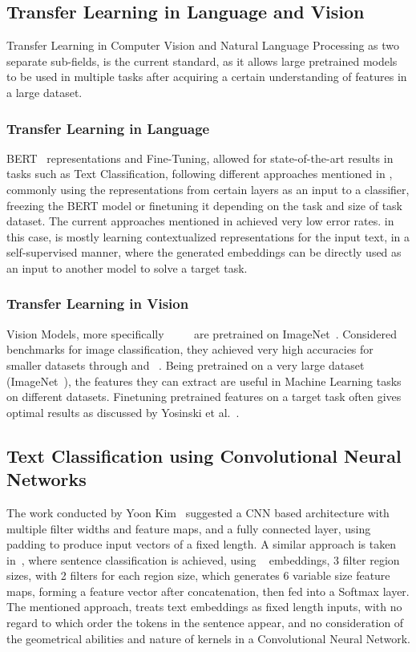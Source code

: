 \documentclass[conference]{IEEEtran}
\begin{document}
\subsection{Transfer Learning in Language and Vision}
Transfer Learning in Computer Vision and Natural Language Processing as two separate sub-fields, is the current standard, as it allows large pretrained models to be used in multiple tasks after acquiring a certain understanding of features in a large dataset.

\subsubsection{Transfer Learning in Language}

BERT~\cite{Bert} representations and Fine-Tuning,
allowed for state-of-the-art results in tasks such as Text Classification, following different approaches mentioned in \cite{bertfine}, commonly using the  representations from certain layers as an input to a classifier, freezing the BERT model or finetuning it depending on the task and size of task dataset. The current approaches mentioned in \cite{bertfine} achieved very low error rates.  in this case, is mostly learning contextualized representations for the input text, in a self-supervised manner, where the generated embeddings can be directly used as an input to another model to solve a target task. 

\subsubsection{Transfer Learning in Vision}
Vision Models, more specifically \cite{alexnet}~\cite{shufflenetv2}~\cite{vgg16}~\cite{resnet}~\cite{resnext} are pretrained on ImageNet~\cite{imagenet}. Considered benchmarks for image classification, they achieved very high accuracies for smaller datasets through  and ~\cite{domainshift}. Being pretrained on a very large dataset (ImageNet~\cite{imagenet}), the features they can extract are useful in Machine Learning tasks on different datasets. Finetuning pretrained features on a target task often gives optimal results as discussed by Yosinski et al.~\cite{howtransferable}. 

\subsection{Text Classification using Convolutional Neural Networks}
The work conducted by Yoon Kim~\cite{kim2014convolutional} suggested a CNN based architecture with multiple filter widths and feature maps, and a fully connected layer,  using padding to produce input vectors of a fixed length. A similar approach is taken in~\cite{conv4text}, where sentence classification is achieved, using ~\cite{word2vec} embeddings, 3 filter region sizes, with 2 filters for each region size, which generates 6 variable size feature maps, forming a feature vector after concatenation, then fed into a Softmax layer. The mentioned approach, treats text embeddings as fixed length inputs, with no regard to which order the tokens in the sentence appear, and no consideration of the geometrical abilities and nature of kernels in a Convolutional Neural Network.
\end{document}
